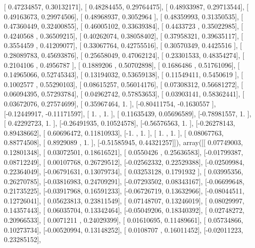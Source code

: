 \documentclass{article}
\begin{document}
       [ 0.47234857,  0.30132171],
       [ 0.48284455,  0.29764475],
       [ 0.48933987,  0.29713544],
       [ 0.49163673,  0.29974506],
       [ 0.48968937,  0.3052964 ],
       [ 0.48359993,  0.31350535],
       [ 0.47360449,  0.32400855],
       [ 0.46005102,  0.33639384],
       [ 0.4433723 ,  0.35022985],
       [ 0.4240568 ,  0.36509215],
       [ 0.40262074,  0.38058402],
       [ 0.37958321,  0.39635117],
       [ 0.3554459 ,  0.41209077],
       [ 0.33067764,  0.42755516],
       [ 0.30570349,  0.4425516 ],
       [ 0.28089783,  0.45693876],
       [ 0.25658049,  0.47062124],
       [ 0.23301533,  0.48354274],
       [ 0.2104106 ,  0.4956787 ],
       [ 0.1889206 ,  0.50702898],
       [ 0.1686486 ,  0.51761096],
       [ 0.14965066,  0.52745343],
       [ 0.13194032,  0.53659138],
       [ 0.11549411,  0.5450619 ],
       [ 0.1002577 ,  0.55290103],
       [ 0.08615257,  0.56014176],
       [ 0.07308312,  0.56681272],
       [ 0.06094395,  0.57293784],
       [ 0.04962742,  0.57853653],
       [ 0.03903141,  0.58362441],
       [ 0.03672076,  0.27574699],
       [ 0.35967464,  1.        ],
       [-0.80411754, -0.1630557 ],
       [-0.12449917, -0.11171597],
       [ 1.        ,  1.        ],
       [ 0.11635439,  0.05696589],
       [-0.78981557,  1.        ],
       [ 0.42292723,  1.        ],
       [-0.26491935,  0.10524578],
       [-0.56576563,  1.        ],
       [-0.26278143,  0.89438662],
       [ 0.60696472,  0.11810933],
       [-1.        ,  1.        ],
       [ 1.        ,  1.        ],
       [ 0.08067763,  0.88774508],
       [ 0.8929089 ,  1.        ],
       [-0.51585945,  0.44321257]]), array([[ 0.07749003,  0.12801348],
       [ 0.03072501,  0.18616521],
       [ 0.0550426 ,  0.25636583],
       [-0.01799387,  0.08712249],
       [ 0.00107768,  0.26729512],
       [-0.02562332,  0.22529388],
       [-0.02509984,  0.22364049],
       [-0.06791631,  0.13079734],
       [ 0.03253128,  0.1791932 ],
       [ 0.03995356,  0.26270785],
       [-0.03816983,  0.24709291],
       [-0.07293502,  0.08343167],
       [-0.06699648,  0.21735225],
       [-0.03917968,  0.16591233],
       [-0.06726719,  0.13632966],
       [-0.08044511,  0.12726041],
       [ 0.05623813,  0.23811549],
       [ 0.07148707,  0.13246019],
       [ 0.08029997,  0.14357443],
       [ 0.06035704,  0.13342464],
       [-0.05049206,  0.18340392],
       [ 0.02748272,  0.20966533],
       [ 0.0071211 ,  0.24029399],
       [ 0.01610695,  0.11489661],
       [ 0.05734866,  0.10273734],
       [-0.00520994,  0.13148252],
       [ 0.0108707 ,  0.16011452],
       [-0.02011223,  0.23285152],
\end{document}
